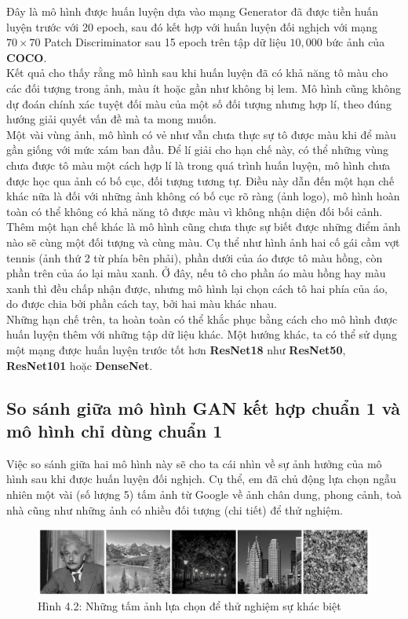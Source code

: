 \documentclass[a4paper]{article}
\begin{document}
\noindent
Đây là mô hình được huấn luyện dựa  vào mạng Generator đã được tiền huấn luyện trước với 20 epoch, sau đó kết hợp với huấn luyện đối nghịch với mạng $70\times 70$ Patch Discriminator sau 15 epoch trên tập dữ liệu $10,000$ bức ảnh của \textbf{COCO}.\\
Kết quả cho thấy rằng mô hình sau khi huấn luyện đã có khả năng tô màu cho các đối tượng trong ảnh, màu ít hoặc gần như không bị lem. Mô hình cũng không dự đoán chính xác tuyệt đối màu của một số đối tượng nhưng hợp lí, theo đúng hướng giải quyết vấn đề mà ta mong muốn.\\
Một vài vùng ảnh, mô hình có vẻ như vẫn chưa thực sự tô được màu khi để màu gần giống với mức xám ban đầu. Để lí giải cho hạn chế này, có thể những vùng chưa được tô màu một cách hợp lí là trong quá trình huấn luyện, mô hình chưa được học qua ảnh có bố cục, đối tượng tương tự. Điều này dẫn đến một hạn chế khác nữa là đối với những ảnh không có bố cục rõ ràng (ảnh logo), mô hình hoàn toàn có thể không có khả năng tô được màu vì không nhận diện đối bối cảnh. Thêm một hạn chế khác là mô hình cũng chưa thực sự biết được những điểm ảnh nào sẽ cùng một đối tượng và cùng màu. Cụ thể như hình ảnh hai cố gái cầm vợt tennis (ảnh thứ 2 từ phía bên phải), phần dưới của áo được tô màu hồng, còn phần trên của áo lại màu xanh. Ở đây, nếu tô cho phần áo màu hồng hay màu xanh thì đều chấp nhận được, nhưng mô hình lại chọn cách tô hai phía của áo, do được chia bởi phần cách tay, bởi hai màu khác nhau.\\
Những hạn chế trên, ta hoàn toàn có thể khắc phục bằng cách cho mô hình được huấn luyện thêm với những tập dữ liệu khác. Một hướng khác, ta có thể sử dụng một mạng được huấn luyện trước tốt hơn \textbf{ResNet18} như \textbf{ResNet50}, \textbf{ResNet101} hoặc \textbf{DenseNet}.

\subsection{So sánh giữa mô hình GAN kết hợp chuẩn 1 và mô hình chỉ dùng chuẩn 1}
Việc so sánh giữa hai mô hình này sẽ cho ta cái nhìn về sự ảnh hưởng của mô hình sau khi được huấn luyện đối nghịch. Cụ thể, em đã chủ động lựa chọn ngẫu nhiên một vài (số lượng 5) tấm ảnh từ Google về ảnh chân dung, phong cảnh, toà nhà cũng như những ảnh có nhiều đối tượng (chi tiết) để thử nghiệm.

\begin{figure}[h!]
\centering
\includegraphics[width=16cm]{images/4_2.PNG}
\caption{Hình 4.2: Những tấm ảnh lựa chọn để thử nghiệm sự khác biệt}
\end{figure}
\end{document}
